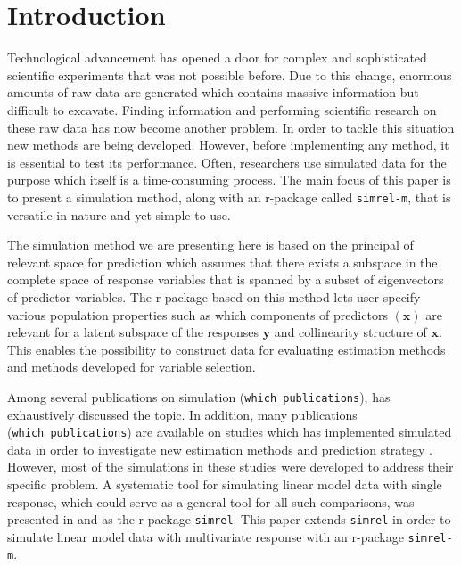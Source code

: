 \documentclass[12pt,A4paper,authoryear]{elsarticle} %
\theoremstyle{definition}
\theoremstyle{definition}
\theoremstyle{remark}
\begin{document}
\section{Introduction}\label{introduction}

Technological advancement has opened a door for complex and
sophisticated scientific experiments that was not possible before. Due
to this change, enormous amounts of raw data are generated which
contains massive information but difficult to excavate. Finding
information and performing scientific research on these raw data has now
become another problem. In order to tackle this situation new methods
are being developed. However, before implementing any method, it is
essential to test its performance. Often, researchers use simulated data
for the purpose which itself is a time-consuming process. The main focus
of this paper is to present a simulation method, along with an r-package
called \texttt{simrel-m}, that is versatile in nature and yet simple to
use.

The simulation method we are presenting here is based on the principal
of relevant space for prediction \citep{helland1994comparison} which
assumes that there exists a subspace in the complete space of response
variables that is spanned by a subset of eigenvectors of predictor
variables. The r-package based on this method lets user specify various
population properties such as which components of predictors
\((\mathbf{x})\) are relevant for a latent subspace of the responses
\(\mathbf{y}\) and collinearity structure of \(\mathbf{x}\). This
enables the possibility to construct data for evaluating estimation
methods and methods developed for variable selection.

Among several publications on simulation
({\color{red}\texttt{which\ publications}}),
\citet{ripley2009stochastic} has exhaustively discussed the topic. In
addition, many publications ({\color{red}\texttt{which\ publications}})
are available on studies which has implemented simulated data in order
to investigate new estimation methods and prediction strategy
\citep[see:][]{cook2015simultaneous, cook2013envelopes, helland2012near}.
However, most of the simulations in these studies were developed to
address their specific problem. A systematic tool for simulating linear
model data with single response, which could serve as a general tool for
all such comparisons, was presented in \citet{saebo2015simrel} and as
the r-package \texttt{simrel}. This paper extends \texttt{simrel} in
order to simulate linear model data with multivariate response with an
r-package \texttt{simrel-m}.
\end{document}
